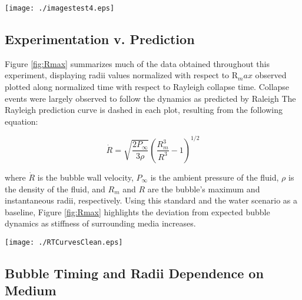 \documentclass[prl,aps,epsf,twocolumn,superscriptaddress]{revtex4-1}
\begin{document}
\begin{figure*}[ht!] \centering
	\begin{center} 
		\texttt{[image: ./imagestest4.eps]} 
	\end{center}
	\caption{Example images highlighting the difference in size of single bubbles generated utilizing both histotripsy and laser in increasingly concentrated gel mediums. Asterisks marks frame(s) outside of the bubbles primary lifetime that were thereby discarded from the database. Frame dimensions = 0.6 x 0.6 mm}
	\label{fig:images}
\end{figure*}

\subsection{Experimentation v. Prediction} \label{sec:exp_v_pred}

Figure \ref{fig:Rmax} summarizes much of the data obtained throughout this experiment, displaying radii values normalized with respect to R$_max$ observed plotted along normalized time with respect to Rayleigh collapse time. Collapse events were largely observed to follow the dynamics as predicted by Raleigh \cite{rayleigh1917} The Rayleigh prediction curve is dashed in each plot, resulting from the following equation: 

\begin{equation}\label{eq:rayPredict}
	\dot{R}=\sqrt{\frac{2P_{\infty}}{3\rho}}\left(\frac{R_m^3}{R^3}-1\right)^{1/2}
\end{equation} 

where $\dot{R}$ is the bubble wall velocity, $P_{\infty}$ is the ambient pressure of the fluid, $\rho$ is the density of the fluid, and $R_m$ and $R$ are the bubble's maximum and instantaneous radii, respectively. Using this standard and the water scenario as a baseline, Figure \ref{fig:Rmax} highlights the deviation from expected bubble dynamics as stiffness of surrounding media increases. 

\begin{figure*}[ht!] \centering
	\begin{center} 
		\texttt{[image: ./RTCurvesClean.eps]} 
	\end{center}
	\caption{Normalized Radius and time with respect to R$_{max}$ and t$_{Rayleigh}$ respectively of single bubbles in media of varying stiffness.}
	\label{fig:Rmax}
\end{figure*}

\subsection{Bubble Timing and Radii Dependence on Medium} \label{sec:rtcurves}
\end{document}

